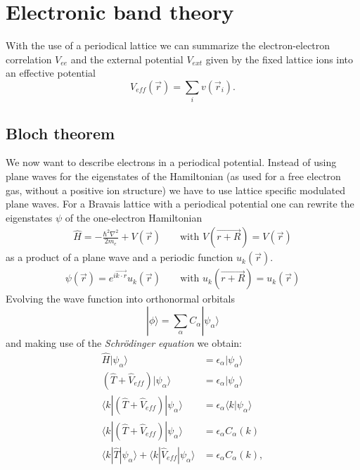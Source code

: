	\section{Electronic band theory}
		With the use of a periodical lattice we can summarize the electron-electron correlation $V_{ee}$ and the external potential $V_{ext}$ given by the fixed lattice ions into an effective potential 
		\begin{equation}
			V_{eff}(\vec r) = \sum_i v(\vec r_i).
		\end{equation}		
		\subsection{Bloch theorem}
			\label{sec:bloch}
			We now want to describe electrons in a periodical potential. Instead of using plane waves for the eigenstates of the Hamiltonian (as used for a free electron gas, without a positive ion structure) we have to use lattice specific modulated plane waves.	For a Bravais lattice with a periodical potential one can rewrite the eigenstates $\psi$ of the one-electron Hamiltonian
			\begin{align}
				\hat H = -\frac{ \hbar^2 \nabla^2}{2m_e} + V(\vec{r}) && \text{ with } V(\vec{r + R}) = V(\vec{r})
			\end{align}
			as a product of a plane wave and a periodic function $u_k(\vec{r})$.
			\begin{align}
				\label{eq:bloch}
				\psi(\vec{r}) = e^{i\vec{k \cdot r}} u_k(\vec{r}) && \text{ with } u_k(\vec{r + R}) = u_k(\vec{r})
			\end{align}	
		Evolving the wave function into orthonormal orbitals
		\begin{equation}
			| \phi \rangle = \sum_{\alpha} C_\alpha |\psi_\alpha \rangle 
		\end{equation}
		and making use of the \textit{Schrödinger equation} we obtain: 
		\begin{equation}
			\begin{split}
				\label{eq:blochSchroedinger}
				\hat H | \psi_\alpha \rangle &= \epsilon_\alpha | \psi_\alpha \rangle \\
				( \hat T + \hat V_{eff}) | \psi_\alpha \rangle &= \epsilon_\alpha | \psi_\alpha \rangle \\
				\langle k | (\hat T + \hat V_{eff}) | \psi_\alpha \rangle &= \epsilon_\alpha \langle k | \psi_\alpha \rangle \\
				\langle k | (\hat T + \hat V_{eff}) | \psi_\alpha \rangle &= \epsilon_\alpha C_\alpha(k) \\
				\langle k | \hat T | \psi_\alpha \rangle + \langle k | \hat V_{eff} | \psi_\alpha \rangle &= \epsilon_\alpha C_\alpha(k),
			\end{split}
		\end{equation}

